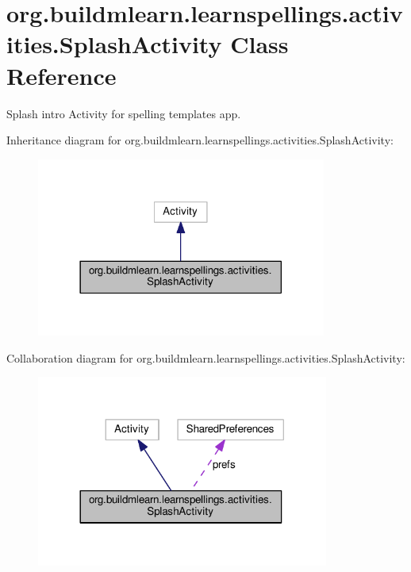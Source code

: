 \hypertarget{classorg_1_1buildmlearn_1_1learnspellings_1_1activities_1_1SplashActivity}{}\section{org.\+buildmlearn.\+learnspellings.\+activities.\+Splash\+Activity Class Reference}
\label{classorg_1_1buildmlearn_1_1learnspellings_1_1activities_1_1SplashActivity}


Splash intro Activity for spelling template\textquotesingle{}s app.  




Inheritance diagram for org.\+buildmlearn.\+learnspellings.\+activities.\+Splash\+Activity\+:
\nopagebreak
\begin{figure}[H]
\begin{center}
\leavevmode
\includegraphics[width=270pt]{classorg_1_1buildmlearn_1_1learnspellings_1_1activities_1_1SplashActivity__inherit__graph}
\end{center}
\end{figure}


Collaboration diagram for org.\+buildmlearn.\+learnspellings.\+activities.\+Splash\+Activity\+:
\nopagebreak
\begin{figure}[H]
\begin{center}
\leavevmode
\includegraphics[width=272pt]{classorg_1_1buildmlearn_1_1learnspellings_1_1activities_1_1SplashActivity__coll__graph}
\end{center}
\end{figure}
